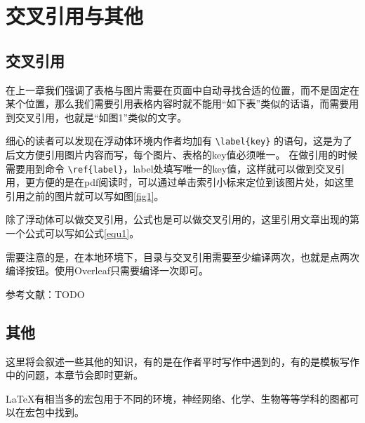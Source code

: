\section{交叉引用与其他}
\subsection{交叉引用}
在上一章我们强调了表格与图片需要在页面中自动寻找合适的位置，而不是固定在某个位置，那么我们需要引用表格内容时就不能用“如下表”类似的话语，而需要用到交叉引用，也就是“如图1”类似的文字。

细心的读者可以发现在浮动体环境内作者均加有 \verb|\label{key}| 的语句，这是为了后文方便引用图片内容而写，每个图片、表格的key值必须唯一。
在做引用的时候需要用到命令 \verb|\ref{label}|，label处填写唯一的key值，这样就可以做到交叉引用，更方便的是在pdf阅读时，可以通过单击索引小标来定位到该图片处，如这里引用之前的图片就可以写如图\ref{fig1}。

除了浮动体可以做交叉引用，公式也是可以做交叉引用的，这里引用文章出现的第一个公式可以写如公式\ref{equ1}。

需要注意的是，在本地环境下，目录与交叉引用需要至少编译两次，也就是点两次编译按钮。使用Overleaf只需要编译一次即可。

参考文献：TODO

\subsection{其他}
这里将会叙述一些其他的知识，有的是在作者平时写作中遇到的，有的是模板写作中的问题，本章节会即时更新。

\LaTeX 有相当多的宏包用于不同的环境，神经网络、化学、生物等等学科的图都可以在宏包中找到。